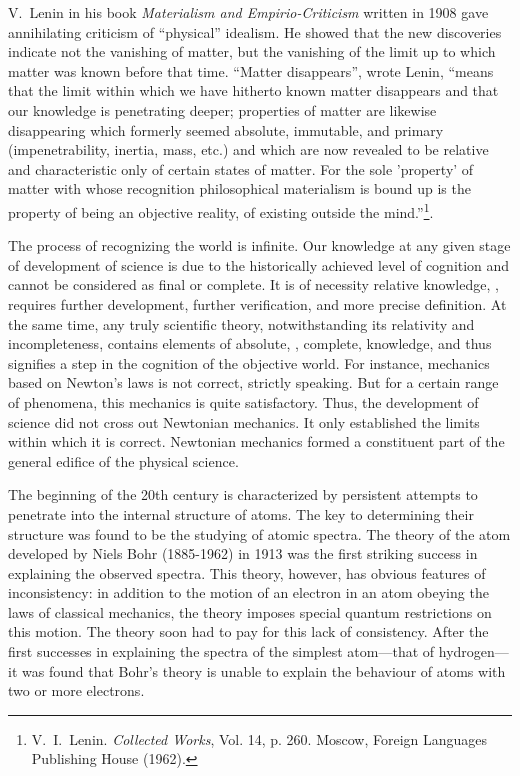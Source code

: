 V.~Lenin in his book \textit{Materialism and Empirio-Criticism} written in 1908 gave annihilating criticism of ``physical'' idealism. He showed that the new discoveries indicate not the vanishing of matter, but the vanishing of the limit up to which matter was known before that time. ``Matter disappears'', wrote Lenin, ``means that the limit within which we have hitherto known matter disappears and that our knowledge is penetrating deeper; properties of matter are likewise disappearing which formerly seemed absolute, immutable, and primary (impenetrability, inertia, mass, etc.) and which are now revealed to be relative and characteristic only of certain states of matter. For the sole 'property' of matter with whose recognition philosophical materialism is bound up is the property of being an objective reality, of existing outside the mind.''\footnote{V.~I.~Lenin. \textit{Collected Works}, Vol. 14, p. 260. Moscow, Foreign Languages Publishing House (1962).}.

The process of recognizing the world is infinite. Our knowledge at any given stage of development of science is due to the historically achieved level of cognition and cannot be considered as final or complete. It is of necessity relative knowledge, \ie, requires further development, further verification, and more precise definition. At the same time, any truly scientific theory, notwithstanding its relativity and incompleteness, contains elements of absolute, \ie, complete, knowledge, and thus signifies a step in the cognition of the objective world. For instance, mechanics based on Newton's laws is not correct, strictly speaking. But for a certain range of phenomena, this mechanics is quite satisfactory. Thus, the development of science did not cross out Newtonian mechanics. It only established the limits within which it is correct. Newtonian mechanics formed a constituent part of the general edifice of the physical science.

The beginning of the 20th century is characterized by persistent attempts to penetrate into the internal structure of atoms. The key to determining their structure was found to be the studying of atomic spectra. The theory of the atom developed by Niels Bohr (1885-1962) in 1913 was the first striking success in explaining the observed spectra. This theory, however, has obvious features of inconsistency: in addition to the motion of an electron in an atom obeying the laws of classical mechanics, the theory imposes special quantum restrictions on this motion. The theory soon had to pay for this lack of consistency. After the first successes in explaining the spectra of the simplest atom---that of hydrogen---it was found that Bohr's theory is unable to explain the behaviour of atoms with two or more electrons.

